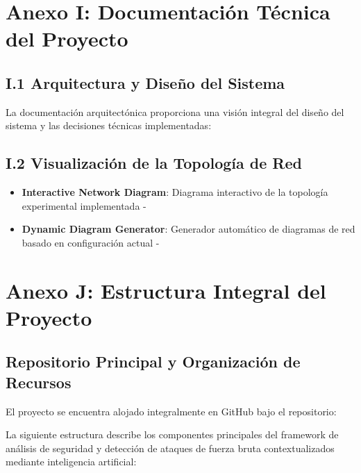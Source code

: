 \section*{Anexo I: Documentación Técnica del Proyecto}

\subsection*{I.1 Arquitectura y Diseño del Sistema}
La documentación arquitectónica proporciona una visión integral del diseño del sistema y las decisiones técnicas implementadas: 

\subsection*{I.2 Visualización de la Topología de Red}
\begin{itemize}
    \item \textbf{Interactive Network Diagram}: Diagrama interactivo de la topología experimental implementada - 
    \item \textbf{Dynamic Diagram Generator}: Generador automático de diagramas de red basado en configuración actual - 
\end{itemize}

\section*{Anexo J: Estructura Integral del Proyecto}

\subsection*{Repositorio Principal y Organización de Recursos}

El proyecto se encuentra alojado integralmente en GitHub bajo el repositorio: 

La siguiente estructura describe los componentes principales del framework de análisis de seguridad y detección de ataques de fuerza bruta contextualizados mediante inteligencia artificial:

